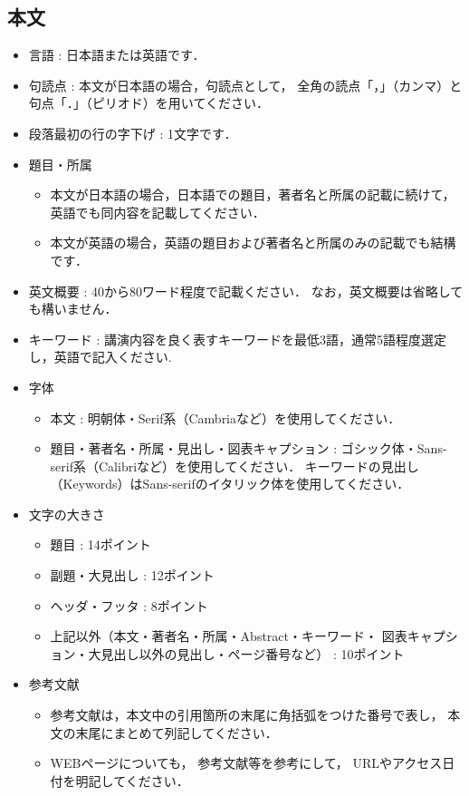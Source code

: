 \documentclass{ltjoc}
\begin{document}
\subsection{本文}
\begin{itemize}
\item 言語 : 日本語または英語です．
\item 句読点 : 本文が日本語の場合，句読点として，
  全角の読点「，」（カンマ）と句点「．」（ピリオド）を用いてください． 
\item 段落最初の行の字下げ : 1文字です．
\item 題目・所属
  \begin{itemize}
  \item 
    本文が日本語の場合，日本語での題目，著者名と所属の記載に続けて，
    英語でも同内容を記載してください．
  \item 
    本文が英語の場合，英語の題目および著者名と所属のみの記載でも結構です．
  \end{itemize}
\item 英文概要 : 40から80ワード程度で記載ください．
  なお，英文概要は省略しても構いません．
\item キーワード : 講演内容を良く表すキーワードを最低3語，通常5語程度選定し，英語で記入ください.
\item 字体
  \begin{itemize}
  \item 本文 :
    明朝体・Serif系（Cambriaなど）を使用してください．
  \item 題目・著者名・所属・見出し・図表キャプション : 
    ゴシック体・Sans-serif系（Calibriなど）を使用してください．
    キーワードの見出し（Keywords）はSans-serifのイタリック体を使用してください．
  \end{itemize}
\item 文字の大きさ
  \begin{itemize}
  \item 題目 : 14ポイント
  \item 副題・大見出し : 12ポイント
  \item ヘッダ・フッタ : 8ポイント
  \item 上記以外（本文・著者名・所属・Abstract・キーワード・
      図表キャプション・大見出し以外の見出し・ページ番号など） : 10ポイント
  \end{itemize}
\item 参考文献
  \begin{itemize}
  \item 
  参考文献は，本文中の引用箇所の末尾に角括弧をつけた番号で表し，
  本文の末尾にまとめて列記してください．
  \item 
  WEBページについても，
  参考文献\cite{SIST02-200}等を参考にして，
  URLやアクセス日付を明記してください．
  \end{itemize}
\end{itemize}
\end{document}
